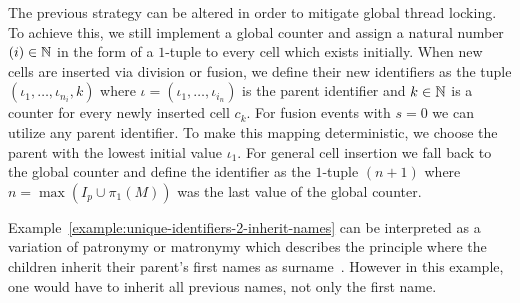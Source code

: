 \begin{example}
    The previous strategy can be altered in order to mitigate global thread locking.
    To achieve this, we still implement a global counter and assign a natural number $(i)\in\mathbb{N}$ in
    the form of a $1$-tuple to every cell which exists initially.
    When new cells are inserted via division or fusion, we define their new identifiers as the tuple
    $(\iota_1,\dots,\iota_{n_i},k)$ where $\iota=(\iota_1,\dots,\iota_{i_n})$ is the parent
    identifier and $k\in\mathbb{N}$ is a counter for every newly inserted cell $c_k$.
    For fusion events with $s=0$ we can utilize any parent identifier.
    To make this mapping deterministic, we choose the parent with the lowest initial value
    $\iota_1$.
    For general cell insertion we fall back to the global counter and define the identifier as the
    $1$-tuple $(n+1)$ where $n=\max(I_p\cup\pi_1(M))$ was the last value of the global counter.
    \label{example:unique-identifiers-2-inherit-names}
\end{example}

Example~\ref{example:unique-identifiers-2-inherit-names} can be interpreted as a variation of
patronymy or matronymy which describes the principle where the children inherit their parent's first
names as surname~\cite{2016OxfordNaming}.
However in this example, one would have to inherit all previous names, not only the first name.

